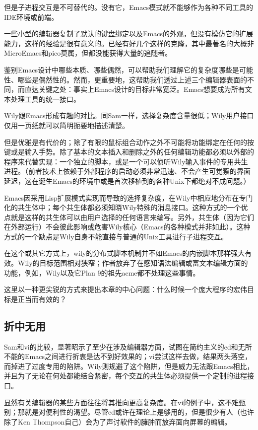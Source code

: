 \documentclass[12pt,oneside]{book}
\begin{document}
但是子进程交互是不可替代的。没有它，Emacs模式就不能够作为各种不同工具的IDE环境或前端。

一些小型的编辑器复制了默认的键盘绑定以及Emacs的外观，但没有模仿它的扩展能力，这样的经验是很有意义的。已经有好几个这样的克隆，其中最著名的大概非MicroEmacs和pico莫属，但都没能获得大量的追随者。

鉴别Emacs设计中哪些本质、哪些偶然，可以帮助我们理解它的复杂度哪些是可能性、哪些是偶然性的。然而，更重要地，这帮助我们透过上述三个编辑器表面的不同，而直达关键之处：事实上Emacs设计的目标非常宽泛。Emacs想要成为所有文本处理工具的统一接口。

Wily跟Emacs形成有趣的对比。同Sam一样，选择复杂度含量很低；Wily用户接口仅用一页纸就可以简明扼要地描述清楚。

但是优雅是有代价的；除了有限的鼠标组合动作之外不可能将功能绑定在任何的按键或是输入手势。除了基本的文本插入和删除之外的任何编辑功能都必须以外部的程序来代替实现：一个独立的脚本，或是一个可以侦听Wily输入事件的专用共生进程。（前者技术上依赖于外部程序的启动必须非常迅速、不会产生可觉察的界面延迟，这在诞生Emacs的环境中或是首次移植到的各种Unix下都绝对不成问题。）

Emacs因采用Lisp扩展模式实现而导致的选择复杂度，在Wily中相应地分布在专门化的共生体中；每个共生体都必须知晓Wily特殊的消息接口。这种方式的一个优点就是这样的共生体可以由用户选择的任何语言来编写。另外，共生体（因为它们在外部运行）不会彼此影响或危害Wily核心（Emacs的各种模式并非如此）。这种方式的一个缺点是Wily自身不能直接与普通的Unix工具进行子进程交互。

在这个或其它方式上，wily的分布式脚本机制并不如Emacs的内嵌脚本那样强大有效。Wily的目标范围相对狭窄；作者放弃了在感知语法编辑或富文本编辑方面的功能，例如，Wily以及它Plan 9的祖先acme都不处理这些事情。

这里以一种更尖锐的方式来提出本章的中心问题：什么时候一个庞大程序的宏伟目标是正当而有效的？


\subsection{折中无用}
Sam和vi的比较，显著昭示了至少在涉及编辑器方面，试图在简约主义的ed和无所不能的Emacs之间进行折衷是达不到好效果的；vi尝试这样去做，结果两头落空，而掉进了过度专用的陷阱。Wily则规避了这个陷阱，但是威力无法跟Emacs相比，并且为了无论在何处都能结合紧密，每个交互的共生体必须提供一个定制的进程接口。

显然有关编辑器的某些方面往往将其推向更高复杂度。在vi的例子中，这不难甄别；那就是对便利性的渴望。尽管ed或许在理论上是够用的，但是很少有人（也许除了Ken Thompson自己）会为了声讨软件的臃肿而放弃面向屏幕的编辑。
\end{document}
